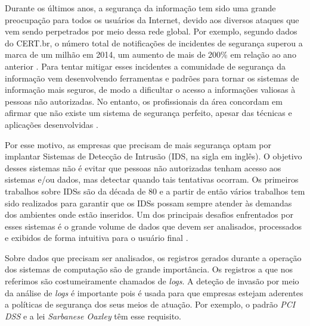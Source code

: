 \documentclass[
	12pt,				%
	openright,			%
	twoside,			%
	a4paper,			%
	english,			%
	spanish,			%
	brazil,				%
	]{abntex2}
\begin{document}
Durante os últimos anos, a segurança da informação tem sido uma grande preocupação para todos os usuários da Internet, devido aos diversos ataques que vem sendo perpetrados por meio dessa rede global. Por exemplo, segundo dados do CERT.br, o número total de notificações de incidentes de segurança superou a marca de um milhão em 2014, um aumento de mais de 200\% em relação ao ano anterior \cite{incidentes2015incidentes}. Para tentar mitigar esses incidentes a comunidade de segurança da informação vem desenvolvendo ferramentas e padrões para tornar os sistemas de informação mais seguros, de modo a dificultar o acesso a informações valiosas à pessoas não autorizadas. No entanto, os profissionais da área concordam em afirmar que não existe um sistema de segurança perfeito, apesar das técnicas e aplicações desenvolvidas \cite{dua2011data}.

Por esse motivo, as empresas que precisam de mais segurança optam por implantar Sistemas de Detecção de Intrusão (IDS, na sigla em inglês). O objetivo desses sistemas não é evitar que pessoas não autorizadas tenham acesso aos sistemas e/ou dados, mas detectar quando tais tentativas ocorram. Os primeiros trabalhos sobre IDSs são da década de 80 \cite{anderson1980computer, denning1987intrusion} e a partir de então vários trabalhos tem sido realizados para garantir que os IDSs possam sempre atender às demandas dos ambientes onde estão inseridos. Um dos principais desafios enfrentados por esses sistemas é o grande volume de dados que devem ser analisados, processados e exibidos de forma intuitiva para o usuário final \cite{big2013big, nassar2013secure}.


Sobre dados que precisam ser analisados, os registros gerados durante a operação dos sistemas de computação são de grande importância. Os registros a que nos referimos são costumeiramente chamados de \emph{logs}. A deteção de invasão por meio da análise de \emph{logs} é importante pois é usada para que empresas estejam aderentes a políticas de segurança dos seus meios de atuação. Por exemplo, o padrão \emph{PCI DSS} e a lei \emph{Sarbanese Oaxley} têm esse requisito.
\end{document}
